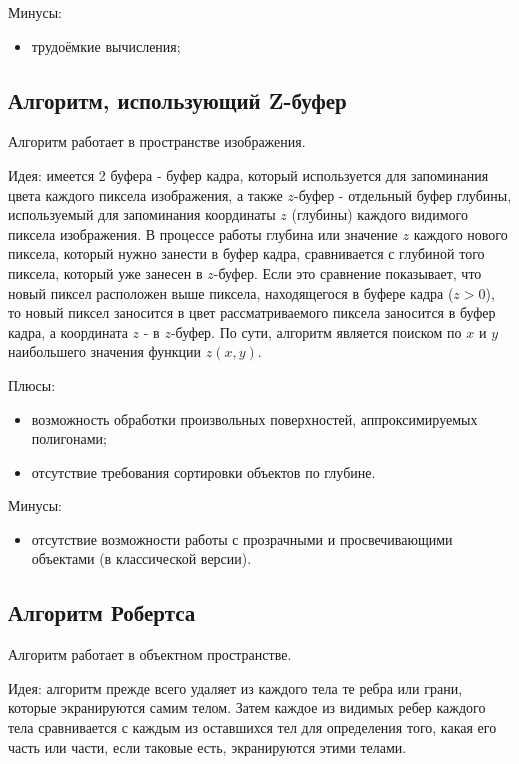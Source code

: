 Минусы:
\begin{itemize}
    \item трудоёмкие вычисления\cite{tracer_proof};
\end{itemize}

\subsection{Алгоритм, использующий Z-буфер}
Алгоритм работает в пространстве изображения\cite{zbuf}.

Идея: имеется 2 буфера - буфер кадра, который используется для запоминания
цвета каждого пиксела изображения, а также $z$-буфер - отдельный буфер глубины,
используемый для запоминания координаты $z$ (глубины) каждого видимого пиксела
изображения. В процессе работы глубина или значение $z$ каждого нового пиксела,
который нужно занести в буфер кадра, сравнивается с глубиной того пиксела,
который уже занесен в $z$-буфер. Если это сравнение показывает, что новый
пиксел расположен выше пиксела, находящегося в буфере кадра ($z > 0$), то новый
пиксел заносится в цвет рассматриваемого пиксела заносится в буфер кадра, а
координата $z$ - в $z$-буфер. По сути, алгоритм является поиском по $x$ и $y$
наибольшего значения функции $z(x, y)$.

Плюсы:
\begin{itemize}
    \item возможность обработки произвольных поверхностей, аппроксимируемых
        полигонами;
    \item отсутствие требования сортировки объектов по глубине.
\end{itemize}

Минусы:
\begin{itemize}
    \item отсутствие возможности работы с прозрачными и просвечивающими
        объектами (в классической версии).
\end{itemize}

\subsection{Алгоритм Робертса}
Алгоритм работает в объектном пространстве\cite{robert}.

Идея: алгоритм прежде всего удаляет из каждого тела те ребра или грани, которые
экранируются самим телом. Затем каждое из видимых ребер каждого тела
сравнивается с каждым из оставшихся тел для определения того, какая его часть
или части, если таковые есть, экранируются этими телами.

